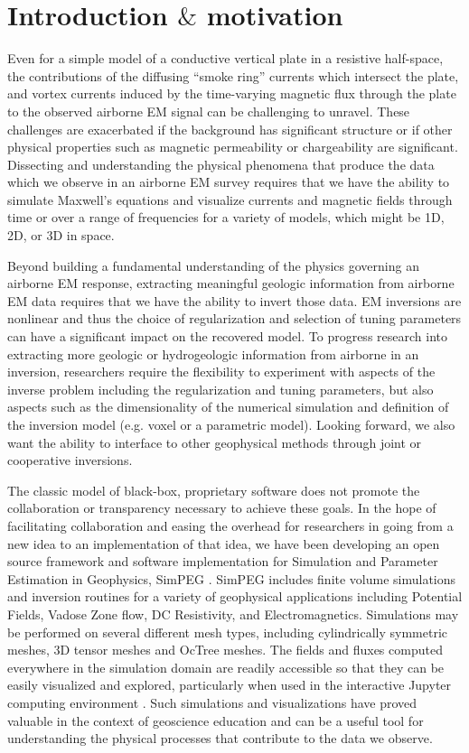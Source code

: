 \documentclass[paper]{geophysics}
\begin{document}
\section{Introduction $\&$ motivation}
Even for a simple model of a conductive vertical plate in a resistive half-space, the contributions of the diffusing ``smoke ring'' currents which intersect the plate, and vortex currents induced by the time-varying magnetic flux through the plate to the observed airborne EM signal can be challenging to unravel. These challenges are exacerbated if the background has significant structure or if other physical properties such as magnetic permeability or chargeability are significant. Dissecting and understanding the physical phenomena that produce the data which we observe in an airborne EM survey requires that we have the ability to simulate Maxwell's equations and visualize currents and magnetic fields through time or over a range of frequencies for a variety of models, which might be 1D, 2D, or 3D in space.

Beyond building a fundamental understanding of the physics governing an airborne EM response, extracting meaningful geologic information from airborne EM data requires that we have the ability to invert those data. EM inversions are nonlinear and thus the choice of regularization and selection of tuning parameters can have a significant impact on the recovered model. To progress research into extracting more geologic or hydrogeologic information from airborne in an inversion, researchers require the flexibility to experiment with aspects of the inverse problem including the regularization and tuning parameters, but also aspects such as the dimensionality of the numerical simulation and definition of the inversion model (e.g. voxel or a parametric model). Looking forward, we also want the ability to interface to other geophysical methods through joint or cooperative inversions.

The classic model of black-box, proprietary software does not promote the collaboration or transparency necessary to achieve these goals. In the hope of facilitating collaboration and easing the overhead for researchers in going from a new idea to an implementation of that idea, we have been developing an open source framework and software implementation for Simulation and Parameter Estimation in Geophysics, SimPEG \citep{cockett2015}. SimPEG includes finite volume simulations and inversion routines for a variety of geophysical applications including Potential Fields, Vadose Zone flow, DC Resistivity, and Electromagnetics. Simulations may be performed on several different mesh types, including cylindrically symmetric meshes, 3D tensor meshes and OcTree meshes. The fields and fluxes computed everywhere in the simulation domain are readily accessible so that they can be easily visualized and explored, particularly when used in the interactive Jupyter computing environment \citep{Perez2015}. Such simulations and visualizations have proved valuable in the context of geoscience education \citep{Oldenburg2017} and can be a useful tool for understanding the physical processes that contribute to the data we observe.
\end{document}

